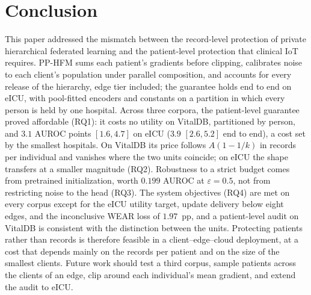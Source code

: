 \section{Conclusion}
\label{sec:conclusion}

This paper addressed the mismatch between the record-level protection of
private hierarchical federated learning and the patient-level protection that
clinical IoT requires. PP-HFM sums each patient's gradients before clipping,
calibrates noise to each client's population under parallel composition, and
accounts for every release of the hierarchy, edge tier included; the guarantee
holds end to end on eICU, with pool-fitted encoders and constants on a
partition in which every person is held by one hospital. Across three corpora,
the patient-level guarantee proved affordable (RQ1): it costs no utility on
VitalDB, partitioned by person, and $3.1$ AUROC points $[1.6, 4.7]$ on eICU
($3.9$ $[2.6, 5.2]$ end to end), a cost set by the smallest hospitals. On VitalDB
its price follows $A(1-1/k)$ in records per individual and vanishes where the
two units coincide; on eICU the shape transfers at a smaller magnitude (RQ2). Robustness to a strict budget comes from pretrained
initialization, worth $0.199$ AUROC at $\varepsilon = 0.5$, not from restricting
noise to the head (RQ3). The system objectives (RQ4) are met on every corpus except for the eICU
utility target, update delivery below eight edges, and the inconclusive WEAR
loss of $1.97$~pp, and a patient-level audit on VitalDB is consistent with the
distinction between the units. Protecting patients rather than records is
therefore feasible in a client--edge--cloud deployment, at a cost that depends
mainly on the records per patient and on the size of the smallest clients.
Future work should test a third corpus, sample patients across the clients of
an edge, clip around each individual's mean gradient, and extend the audit to
eICU.
